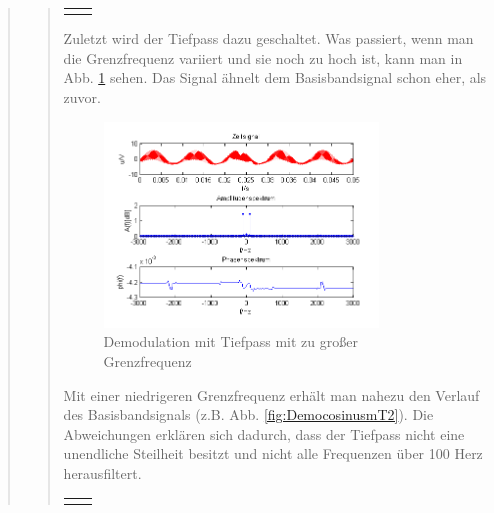 \begin{quote}
\begin{quote}
\begin{center}
\begin{tabular}{ll}
\begin{minipage}{0.67\textwidth}
            \end{minipage}
        
        \end{tabular}
        \end{center}
               
        Zuletzt wird der Tiefpass dazu geschaltet. Was passiert, wenn man die
        Grenzfrequenz variiert und sie noch zu hoch ist, kann man in Abb.
        \ref{fig:TPmitzugrosserGF} sehen. Das Signal ähnelt dem Basisbandsignal
        schon eher, als zuvor.
        
        \begin{figure}[H]
		\begin{center}
			\includegraphics[width=0.8\textwidth]{Bilder/Demo_Sin_2k_100Hz_mo_mitTiefpasszugrosseGrenzfrequenz}
		\end{center}
		\caption{Demodulation mit Tiefpass mit zu großer Grenzfrequenz}
		\label{fig:TPmitzugrosserGF}
	    \end{figure}
	    
	    Mit einer niedrigeren Grenzfrequenz erhält man nahezu den Verlauf des
	    Basisbandsignals (z.B. Abb. \ref{fig:DemocosinusmT2}). Die Abweichungen
	    erklären sich dadurch, dass der Tiefpass nicht eine unendliche Steilheit besitzt und nicht alle Frequenzen
	    über 100 Herz herausfiltert.
	    
	    \begin{center}
        \begin{tabular}{ll}
        
        \hspace{-5cm}
            \begin{minipage}{0.67\textwidth}
                

\end{minipage}
\end{tabular}
\end{center}
\end{quote}
\end{quote}
